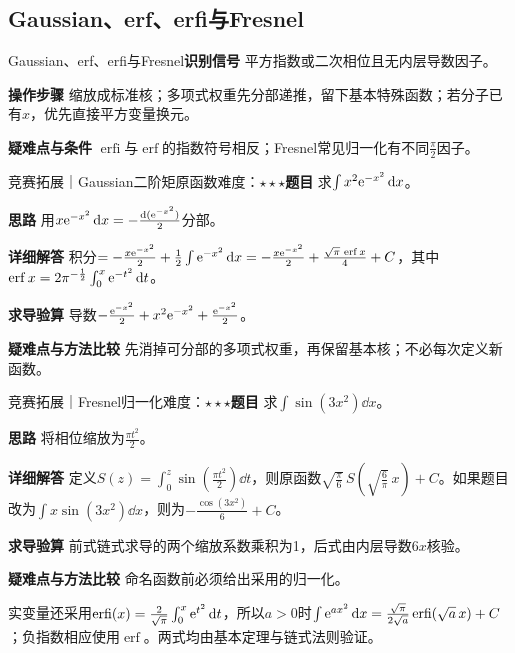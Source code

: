 \subsection{Gaussian、erf、erfi与Fresnel}\label{ic:indefinite_special_complete:gauss}\begin{method}{Gaussian、erf、erfi与Fresnel}\textbf{识别信号} 平方指数或二次相位且无内层导数因子。\par \textbf{操作步骤} 缩放成标准核；多项式权重先分部递推，留下基本特殊函数；若分子已有$x$，优先直接平方变量换元。\par \textbf{疑难点与条件} $\operatorname{erfi}$与$\operatorname{erf}$的指数符号相反；Fresnel常见归一化有不同$\frac{\pi}{2}$因子。\end{method}

\begin{example}{竞赛拓展｜Gaussian二阶矩原函数}{难度：$\star\star\star$}\label{ic:ex:indefinite_special_complete:gaussianmoment}\textbf{题目} 求$\int x^2\mathrm{e}^{-x^2}\mathop{}\!\mathrm{d} x$。\par \textbf{思路} 用$x\mathrm{e}^{-x^2}\mathop{}\!\mathrm{d} x=-\frac{\mathop{}\!\mathrm{d}(\mathrm{e}^{-x^2})}{2}$分部。\par \textbf{详细解答} 积分$=-\frac{x\mathrm{e}^{-x^2}}{2}+\frac12\int\mathrm{e}^{-x^2}\mathop{}\!\mathrm{d} x=-\frac{x\mathrm{e}^{-x^2}}{2}+\frac{\sqrt\pi\,\operatorname{erf}x}{4}+C$，其中$\operatorname{erf}x=2\pi^{-\frac{1}{2}}\int_0^x\mathrm{e}^{-t^2}\mathop{}\!\mathrm{d} t$。\par \textbf{求导验算} 导数$-\frac{\mathrm{e}^{-x^2}}{2}+x^2\mathrm{e}^{-x^2}+\frac{\mathrm{e}^{-x^2}}{2}$。\par \textbf{疑难点与方法比较} 先消掉可分部的多项式权重，再保留基本核；不必每次定义新函数。\end{example}

\begin{example}{竞赛拓展｜Fresnel归一化}{难度：$\star\star\star$}\label{ic:ex:indefinite_special_complete:fresnelscale}\textbf{题目} 求$\int\sin(3x^2)\dd x$。\par \textbf{思路} 将相位缩放为$\frac{\pi t^2}{2}$。\par \textbf{详细解答} 定义$S(z)=\int_0^z\sin(\frac{\pi t^2}{2})\dd t$，则原函数$\sqrt{\frac{\pi}{6}}\,S(\sqrt{\frac{6}{\pi}}\,x)+C$。如果题目改为$\int x\sin(3x^2)\dd x$，则为$-\frac{\cos(3x^2)}{6}+C$。\par \textbf{求导验算} 前式链式求导的两个缩放系数乘积为1，后式由内层导数$6x$核验。\par \textbf{疑难点与方法比较} 命名函数前必须给出采用的归一化。\end{example}

实变量还采用$\operatorname{erfi}(x)=\frac2{\sqrt\pi}\int_0^x\mathrm{e}^{t^2}\mathop{}\!\mathrm{d} t$，所以$a>0$时$\int\mathrm{e}^{ax^2}\mathop{}\!\mathrm{d} x=\frac{\sqrt\pi}{2\sqrt a}\operatorname{erfi}(\sqrt a\,x)+C$；负指数相应使用$\operatorname{erf}$。两式均由基本定理与链式法则验证。

